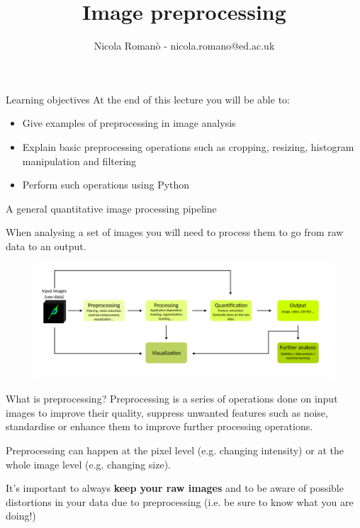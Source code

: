 \documentclass[9pt, aspectratio=169]{beamer}
\author{Nicola Roman\`o - nicola.romano@ed.ac.uk}
\title{Image preprocessing}
\date{}
\begin{document}

\begin{frame}
	\maketitle
\end{frame}

\begin{frame}
	{Learning objectives}
	At the end of this lecture you will be able to:

	\begin{itemize}
		\item Give examples of preprocessing in image analysis
		\item Explain basic preprocessing operations such as cropping, resizing, histogram manipulation and filtering
		\item Perform such operations using Python
	\end{itemize}
\end{frame}

\begin{frame}
	{A general quantitative image processing pipeline}

	When analysing a set of images you will need to process them to go from raw data to an output.

	\begin{figure}
		\centering
		\includegraphics[width=\textwidth]{pipeline.png}
	\end{figure}

\end{frame}

\begin{frame}
	{What is preprocessing?}
	Preprocessing is a series of operations done on input images to improve their quality, suppress unwanted features such as noise, standardise or enhance them to improve further processing operations.

	Preprocessing can happen at the pixel level (e.g. changing intensity) or at the whole image level (e.g. changing size).

	It's important to always \textbf{keep your raw images} and to be aware of possible distortions in your data due to preprocessing (i.e. be sure to know what you are doing!)
\end{frame}
\end{document}
